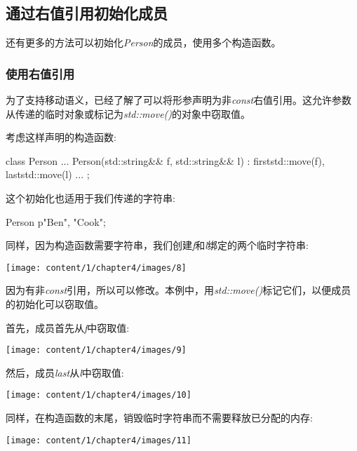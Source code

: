 \subsection{通过右值引用初始化成员}

还有更多的方法可以初始化\textit{Person}的成员，使用多个构造函数。

\subsubsection{使用右值引用}

为了支持移动语义，已经了解了可以将形参声明为非\textit{const}右值引用。这允许参数从传递的临时对象或标记为\textit{std::move()}的对象中窃取值。

考虑这样声明的构造函数:

\begin{cppcode}
class Person {
	...
	Person(std::string&& f, std::string&& l)
	: first{std::move(f)}, last{std::move(l)} {
	}
	...
};
\end{cppcode}

这个初始化也适用于我们传递的字符串:

\begin{cppcode}
Person p{"Ben", "Cook"};
\end{cppcode}

同样，因为构造函数需要字符串，我们创建\textit{f}和\textit{l}绑定的两个临时字符串:

\begin{center}
	\texttt{[image: content/1/chapter4/images/8]}
\end{center}

因为有非\textit{const}引用，所以可以修改。本例中，用\textit{std::move()}标记它们，以便成员的初始化可以窃取值。

首先，成员首先从\textit{f}中窃取值:

\begin{center}
	\texttt{[image: content/1/chapter4/images/9]}
\end{center}

然后，成员\textit{last}从\textit{l}中窃取值:

\begin{center}
	\texttt{[image: content/1/chapter4/images/10]}
\end{center}

同样，在构造函数的末尾，销毁临时字符串而不需要释放已分配的内存:

\begin{center}
	\texttt{[image: content/1/chapter4/images/11]}
\end{center}

